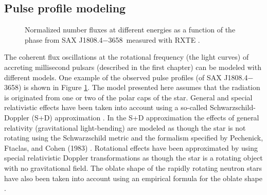 \documentclass{wihuri}
\def\source{SAX J1808.4$-$3658}
\begin{document}
\subsection{Pulse profile modeling}


\begin{figure}
\centerline{} 
\caption{Normalized number fluxes at different energies as a function of the phase from \source \ measured with RXTE . 
\label{fig:saxdata}}
\end{figure}


The coherent flux oscillations at the rotational frequency (the light curves) of accreting millisecond pulsars (described in the first chapter) can be modeled with different models. One example of the observed pulse profiles (of \source) is shown in Figure \ref{fig:saxdata}. The model presented here assumes that the radiation is originated from one or two of the polar caps of the star. General and special relativistic effects have been taken into account using a so-called Schwarzschild-Doppler (S+D) approximation %
\cite{millerlamb98}%
\cite{poutagierlinskisax}. In the S+D approximation the effects of general relativity (gravitational light-bending) are modeled as though the star is not rotating using the Schwarzschild metric and the formalism specified by
Pechenick, Ftaclas, and Cohen (1983) \cite{pechenick}. Rotational effects have been approximated by using special relativistic Doppler transformations as though the star is a rotating object with no gravitational field. The oblate shape of the rapidly rotating neutron stars have also been taken into account using an empirical formula for the oblate shape \cite{algendy} \cite{morsink}.

\end{document}
